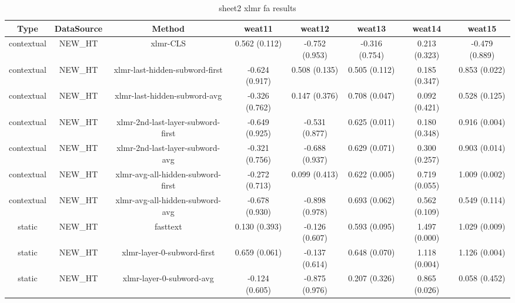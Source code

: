 \begin{sidewaystable}[htb]
    \centering
    \caption{sheet2 xlmr fa results}
    \label{appendix_tab:sheet2_xlmr_fa_results}
    \small
    \begin{tabular}{@{}cccccccc@{}}
        \toprule
        Type & DataSource & Method & weat11 & weat12 & weat13 & weat14 & weat15 \\
        \midrule
        contextual & NEW\_HT & xlmr-CLS & 0.562 (0.112) & -0.752 (0.953) & -0.316 (0.754) & 0.213 (0.323) & -0.479 (0.889) \\
        contextual & NEW\_HT & xlmr-last-hidden-subword-first & -0.624 (0.917) & 0.508 (0.135) & 0.505 (0.112) & 0.185 (0.347) & 0.853 (0.022) \\
        contextual & NEW\_HT & xlmr-last-hidden-subword-avg & -0.326 (0.762) & 0.147 (0.376) & 0.708 (0.047) & 0.092 (0.421) & 0.528 (0.125) \\
        contextual & NEW\_HT & xlmr-2nd-last-layer-subword-first & -0.649 (0.925) & -0.531 (0.877) & 0.625 (0.011) & 0.180 (0.348) & 0.916 (0.004) \\
        contextual & NEW\_HT & xlmr-2nd-last-layer-subword-avg & -0.321 (0.756) & -0.688 (0.937) & 0.629 (0.071) & 0.300 (0.257) & 0.903 (0.014) \\
        contextual & NEW\_HT & xlmr-avg-all-hidden-subword-first & -0.272 (0.713) & 0.099 (0.413) & 0.622 (0.005) & 0.719 (0.055) & 1.009 (0.002) \\
        contextual & NEW\_HT & xlmr-avg-all-hidden-subword-avg & -0.678 (0.930) & -0.898 (0.978) & 0.693 (0.062) & 0.562 (0.109) & 0.549 (0.114) \\
        static & NEW\_HT & fasttext & 0.130 (0.393) & -0.126 (0.607) & 0.593 (0.095) & 1.497 (0.000) & 1.029 (0.009) \\
        static & NEW\_HT & xlmr-layer-0-subword-first & 0.659 (0.061) & -0.137 (0.614) & 0.648 (0.070) & 1.118 (0.004) & 1.126 (0.004) \\
        static & NEW\_HT & xlmr-layer-0-subword-avg & -0.124 (0.605) & -0.875 (0.976) & 0.207 (0.326) & 0.865 (0.026) & 0.058 (0.452) \\
        \bottomrule
    \end{tabular}
\end{sidewaystable}